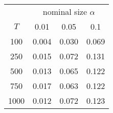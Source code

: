 % 
\begin{tabular}{cccc}
  \hline
  & \multicolumn{3}{c}{nominal size $\alpha$} \\
 $T$ & 0.01 & 0.05 & 0.1 \\
 \hline
100 & 0.004 & 0.030 & 0.069 \\ 
  250 & 0.015 & 0.072 & 0.131 \\ 
  500 & 0.013 & 0.065 & 0.122 \\ 
  750 & 0.017 & 0.063 & 0.122 \\ 
  1000 & 0.012 & 0.072 & 0.123 \\ 
   \hline
\end{tabular}
